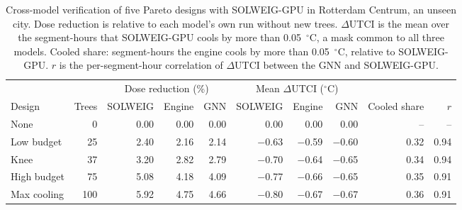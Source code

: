 \begin{table}[tbp]
\centering
\small
\setlength{\tabcolsep}{3pt}
\caption{Cross-model verification of five Pareto designs with SOLWEIG-GPU in Rotterdam Centrum, an unseen city. Dose reduction is relative to each model's own run without new trees. $\Delta$UTCI is the mean over the segment-hours that SOLWEIG-GPU cools by more than 0.05~$^\circ$C, a mask common to all three models. Cooled share: segment-hours the engine cools by more than 0.05~$^\circ$C, relative to SOLWEIG-GPU. $r$ is the per-segment-hour correlation of $\Delta$UTCI between the GNN and SOLWEIG-GPU.}
\label{tab:T6_solweig_verification}
\begin{tabular}{lrrrrrrrrr}
\toprule
 & & \multicolumn{3}{c}{Dose reduction (\%)} & \multicolumn{3}{c}{Mean $\Delta$UTCI ($^\circ$C)} & & \\
\cmidrule(lr){3-5}\cmidrule(lr){6-8}
Design & Trees & SOLWEIG & Engine & GNN & SOLWEIG & Engine & GNN & Cooled share & $r$ \\
\midrule
None & 0 & 0.00 & 0.00 & 0.00 & 0.00 & 0.00 & 0.00 & -- & -- \\
Low budget & 25 & 2.40 & 2.16 & 2.14 & $-$0.63 & $-$0.59 & $-$0.60 & 0.32 & 0.94 \\
Knee & 37 & 3.20 & 2.82 & 2.79 & $-$0.70 & $-$0.64 & $-$0.65 & 0.34 & 0.94 \\
High budget & 75 & 5.08 & 4.18 & 4.09 & $-$0.77 & $-$0.66 & $-$0.65 & 0.35 & 0.91 \\
Max cooling & 100 & 5.92 & 4.75 & 4.66 & $-$0.80 & $-$0.67 & $-$0.67 & 0.36 & 0.91 \\
\bottomrule
\end{tabular}
\end{table}
